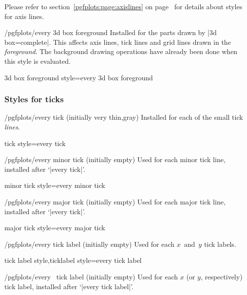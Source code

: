 \noindent
Please refer to section~\ref{pgfplots:page:axislines} on page~\pageref{pgfplots:page:axislines} for details about styles for axis lines.

\begin{stylekey}{/pgfplots/every 3d box foreground}
	Installed for the parts drawn by |3d box=complete|. This affects axis lines, tick lines and grid lines drawn in the \emph{foreground}. The background drawing operations have already been done when this style is evaluated.
\end{stylekey}

\pgfplotsshortstylekey 3d box foreground style=every 3d box foreground\pgfeov


\subsubsection*{Styles for ticks}

\begin{stylekey}{/pgfplots/every tick (initially very thin,gray)}
 Installed for each of the small tick \emph{lines}.
\end{stylekey}

\pgfplotsshortstylekey tick style=every tick\pgfeov

\begin{stylekey}{/pgfplots/every minor tick  (initially empty)}
 Used for each minor tick line, installed after `|every tick|'.
\end{stylekey}

\pgfplotsshortstylekey minor tick style=every minor tick\pgfeov

\begin{stylekey}{/pgfplots/every major tick (initially empty)}
 Used for each major tick line, installed after `|every tick|'.
\end{stylekey}

\pgfplotsshortstylekey major tick style=every major tick\pgfeov

\begin{stylekey}{/pgfplots/every tick label (initially empty)}
 Used for each $x$~and~$y$ tick labels.
\end{stylekey}

\pgfplotsshortxystylekeys tick label style,ticklabel style=every tick label\pgfeov

\begin{xystylekey}{/pgfplots/every \x\ tick label (initially empty)}
 Used for each $x$ (or $y$, respectively) tick label, installed after `|every tick label|'.
\end{xystylekey}

